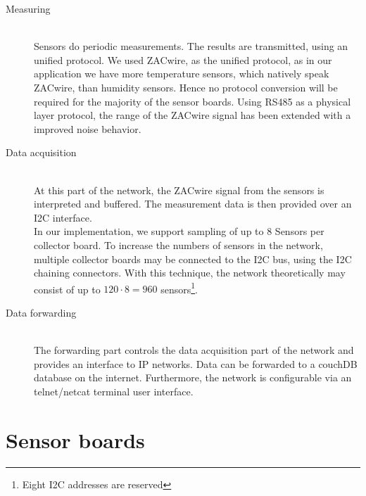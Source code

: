 \documentclass[a4paper]{scrreprt}
\begin{document}
\begin{description}
  \item[Measuring]\hfill \\
    Sensors do periodic measurements. The results are transmitted,
    using an unified protocol. We used ZACwire, as the unified
    protocol, as in our application we have more temperature sensors,
    which natively speak ZACwire, than humidity sensors. Hence no
    protocol conversion will be required for the majority of the
    sensor boards. 
    Using RS485 as a physical layer protocol, the range of the
    ZACwire signal has been extended with a improved noise behavior.
  \item[Data acquisition]\hfill \\
    At this part of the network, the ZACwire signal from the sensors
    is interpreted and buffered. The measurement data is then
    provided over an I2C interface.\\
    In our implementation, we support sampling of up to 8 Sensors
    per collector board. To increase the numbers of sensors in the
    network, multiple collector boards may be connected to the I2C
    bus, using the I2C chaining connectors. With this technique,
    the network theoretically may consist of up to
    $120\cdot 8 = 960$ sensors\footnote{Eight I2C addresses are reserved}.
  \item[Data forwarding]\hfill \\
    The forwarding part controls the data acquisition part of the
    network and provides an interface to IP networks. Data can be
    forwarded to a couchDB database on the internet. Furthermore, the network 
    is configurable via an telnet/netcat terminal user interface.
\end{description}
\section{Sensor boards} \label{chap:sensorbrd}
\end{document}
